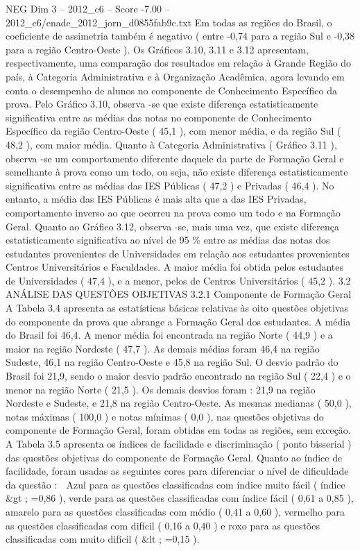 \begin{textsample}{NEG Dim 3 – 2012\_c6 – Score -7.00 – 2012\_c6/enade\_2012\_jorn\_d0855fab9c.txt}
Em todas as regiões do Brasil, o coeficiente de assimetria também é negativo ( entre -0,74 para a região Sul e -0,38 para a região Centro-Oeste ).
Os Gráficos 3.10, 3.11 e 3.12 apresentam, respectivamente, uma comparação dos resultados em relação à Grande Região do país, à Categoria Administrativa e à Organização Acadêmica, agora levando em conta o desempenho de alunos no componente de Conhecimento Específico da prova.
Pelo Gráfico 3.10, observa -se que existe diferença estatisticamente significativa entre as médias das notas no componente de Conhecimento Específico da região Centro-Oeste ( 45,1 ), com menor média, e da região Sul ( 48,2 ), com maior média.
Quanto à Categoria Administrativa ( Gráfico 3.11 ), observa -se um comportamento diferente daquele da parte de Formação Geral e semelhante à prova como um todo, ou seja, não existe diferença estatisticamente significativa entre as médias das IES Públicas ( 47,2 ) e Privadas ( 46,4 ).
No entanto, a média das IES Públicas é mais alta que a das IES Privadas, comportamento inverso ao que ocorreu na prova como um todo e na Formação Geral.
Quanto ao Gráfico 3.12, observa -se, mais uma vez, que existe diferença estatisticamente significativa ao nível de 95 \% entre as médias das notas dos estudantes provenientes de Universidades em relação aos estudantes provenientes Centros Universitários e Faculdades.
A maior média foi obtida pelos estudantes de Universidades ( 47,4 ), e a menor, pelos de Centros Universitários ( 45,2 ). 3.2 ANÁLISE DAS QUESTÕES OBJETIVAS 3.2.1 Componente de Formação Geral A Tabela 3.4 apresenta as estatísticas básicas relativas às oito questões objetivas do componente da prova que abrange a Formação Geral dos estudantes.
A média do Brasil foi 46,4.
A menor média foi encontrada na região Norte ( 44,9 ) e a maior na região Nordeste ( 47,7 ).
As demais médias foram 46,4 na região Sudeste, 46,1 na região Centro-Oeste e 45,8 na região Sul.
O desvio padrão do Brasil foi 21,9, sendo o maior desvio padrão encontrado na região Sul ( 22,4 ) e o menor na região Norte ( 21,5 ).
Os demais desvios foram : 21,9 na região Nordeste e Sudeste, e 21,8 na região Centro-Oeste.
As mesmas medianas ( 50,0 ), notas máximas ( 100,0 ) e notas mínimas ( 0,0 ), nas questões objetivas do componente de Formação Geral, foram obtidas em todas as regiões, sem exceção.
A Tabela 3.5 apresenta os índices de facilidade e discriminação ( ponto bisserial ) das questões objetivas do componente de Formação Geral.
Quanto ao índice de facilidade, foram usadas as seguintes cores para diferenciar o nível de dificuldade da questão :  Azul para as questões classificadas com índice muito fácil ( índice \&gt ; =0,86 ), verde para as questões classificadas com índice fácil ( 0,61 a 0,85 ), amarelo para as questões classificadas com médio ( 0,41 a 0,60 ), vermelho para as questões classificadas com difícil ( 0,16 a 0,40 ) e roxo para as questões classificadas com muito difícil ( \&lt ; =0,15 ).

\end{textsample}
